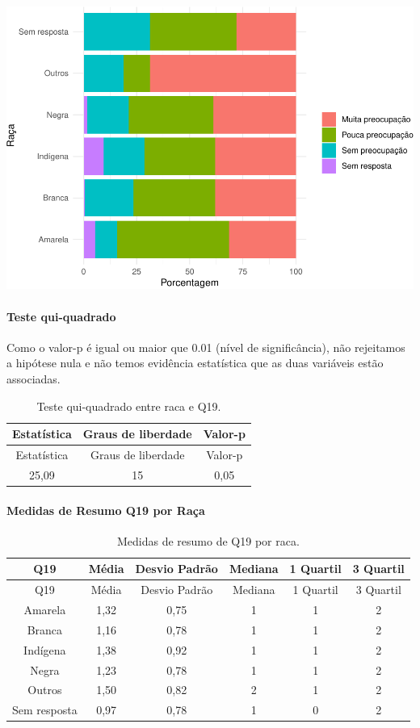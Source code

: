 \documentclass[]{article}
\let\oldparagraph\paragraph
\renewcommand{\paragraph}[1]{\oldparagraph{#1}\mbox{}}
\begin{document}
\begin{center}\includegraphics[width=0.75\linewidth]{relatorio_covid19_files/figure-latex/unnamed-chunk-338-1} \end{center}

\hypertarget{teste-qui-quadrado-30}{%
\paragraph{Teste qui-quadrado}\label{teste-qui-quadrado-30}}

Como o valor-p é igual ou maior que 0.01 (nível de significância), não rejeitamos a hipótese nula e não temos evidência estatística que as duas variáveis estão associadas.

\begin{longtable}[]{@{}ccc@{}}
\caption{\label{tab:unnamed-chunk-340}Teste qui-quadrado entre raca e Q19.}\tabularnewline
\toprule
Estatística & Graus de liberdade & Valor-p\tabularnewline
\midrule
\endfirsthead
\toprule
Estatística & Graus de liberdade & Valor-p\tabularnewline
\midrule
\endhead
25,09 & 15 & 0,05\tabularnewline
\bottomrule
\end{longtable}

\cleardoublepage

\hypertarget{medidas-de-resumo-q19-por-rauxe7a}{%
\paragraph{Medidas de Resumo Q19 por Raça}\label{medidas-de-resumo-q19-por-rauxe7a}}

\begin{longtable}[]{@{}cccccc@{}}
\caption{\label{tab:unnamed-chunk-341}Medidas de resumo de Q19 por raca.}\tabularnewline
\toprule
Q19 & Média & Desvio Padrão & Mediana & 1 Quartil & 3 Quartil\tabularnewline
\midrule
\endfirsthead
\toprule
Q19 & Média & Desvio Padrão & Mediana & 1 Quartil & 3 Quartil\tabularnewline
\midrule
\endhead
Amarela & 1,32 & 0,75 & 1 & 1 & 2\tabularnewline
Branca & 1,16 & 0,78 & 1 & 1 & 2\tabularnewline
Indígena & 1,38 & 0,92 & 1 & 1 & 2\tabularnewline
Negra & 1,23 & 0,78 & 1 & 1 & 2\tabularnewline
Outros & 1,50 & 0,82 & 2 & 1 & 2\tabularnewline
Sem resposta & 0,97 & 0,78 & 1 & 0 & 2\tabularnewline
\bottomrule
\end{longtable}
\end{document}
